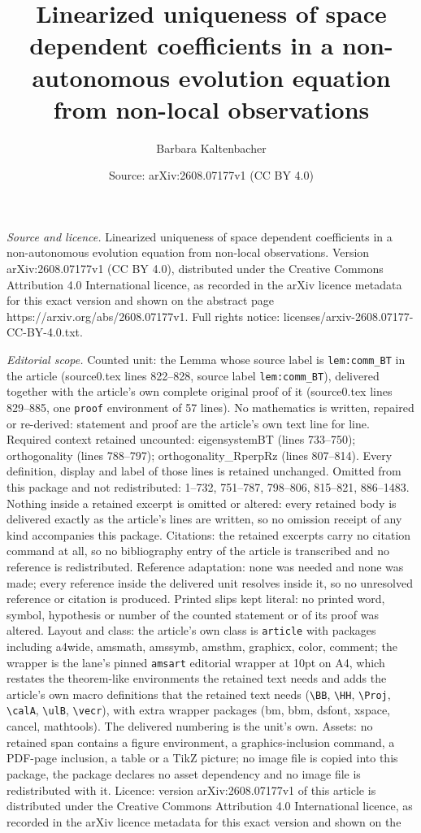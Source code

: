 \documentclass[10pt,a4paper]{amsart}
\title[Linearized uniqueness of space dependent coefficients in a n]{Linearized uniqueness of space dependent coefficients in a non-autonomous evolution equation from non-local observations}
\author{Barbara Kaltenbacher}
\date{Source: arXiv:2608.07177v1 (CC BY 4.0)}
\begin{document}
\maketitle

\noindent\emph{Source and licence.} Linearized uniqueness of space dependent coefficients in a non-autonomous evolution equation from non-local observations. Version arXiv:2608.07177v1 (CC BY 4.0), distributed under the Creative Commons Attribution 4.0 International licence, as recorded in the arXiv licence metadata for this exact version and shown on the abstract page https://arxiv.org/abs/2608.07177v1. Full rights notice: licenses/arxiv-2608.07177-CC-BY-4.0.txt.\par\smallskip

\noindent\textit{Editorial scope.} Counted unit: the Lemma whose source label is \texttt{lem:comm\_BT} in the article (source0.tex lines 822--828, source label \texttt{lem:comm\_BT}), delivered together with the article's own complete original proof of it (source0.tex lines 829--885, one \texttt{proof} environment of 57 lines). No mathematics is written, repaired or re-derived: statement and proof are the article's own text line for line. Required context retained uncounted: eigensystemBT (lines 733--750); orthogonality (lines 788--797); orthogonality\_RperpRz (lines 807--814). Every definition, display and label of those lines is retained unchanged. Omitted from this package and not redistributed: 1--732, 751--787, 798--806, 815--821, 886--1483. Nothing inside a retained excerpt is omitted or altered: every retained body is delivered exactly as the article's lines are written, so no omission receipt of any kind accompanies this package. Citations: the retained excerpts carry no citation command at all, so no bibliography entry of the article is transcribed and no reference is redistributed. Reference adaptation: none was needed and none was made; every reference inside the delivered unit resolves inside it, so no unresolved reference or citation is produced. Printed slips kept literal: no printed word, symbol, hypothesis or number of the counted statement or of its proof was altered. Layout and class: the article's own class is \texttt{article} with packages including a4wide, amsmath, amssymb, amsthm, graphicx, color, comment; the wrapper is the lane's pinned \texttt{amsart} editorial wrapper at 10pt on A4, which restates the theorem-like environments the retained text needs and adds the article's own macro definitions that the retained text needs (\texttt{\textbackslash BB}, \texttt{\textbackslash HH}, \texttt{\textbackslash Proj}, \texttt{\textbackslash calA}, \texttt{\textbackslash ulB}, \texttt{\textbackslash vecr}), with extra wrapper packages (bm, bbm, dsfont, xspace, cancel, mathtools). The delivered numbering is the unit's own. Assets: no retained span contains a figure environment, a graphics-inclusion command, a PDF-page inclusion, a table or a TikZ picture; no image file is copied into this package, the package declares no asset dependency and no image file is redistributed with it. Licence: version arXiv:2608.07177v1 of this article is distributed under the Creative Commons Attribution 4.0 International licence, as recorded in the arXiv licence metadata for this exact version and shown on the 
\end{document}
